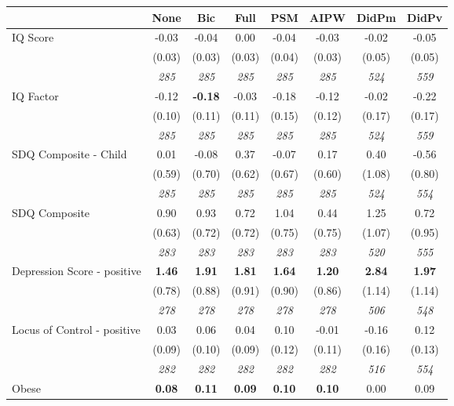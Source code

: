 \begin{tabular}{l c c c c c c c}
\toprule
 & None & Bic & Full & PSM & AIPW & DidPm & DidPv \\
\midrule
IQ Score & -0.03 & -0.04 & 0.00 & -0.04 & -0.03 & -0.02 & -0.05 \\
& (0.03) & (0.03) & (0.03) & (0.04) & (0.03) & (0.05) & (0.05) \\
& \textit{ 285 } & \textit{ 285 } & \textit{ 285 } & \textit{ 285 } & \textit{ 285 } & \textit{ 524 } & \textit{ 559 } \\
IQ Factor & -0.12 & \textbf{ -0.18 } & -0.03 & -0.18 & -0.12 & -0.02 & -0.22 \\
& (0.10) & (0.11) & (0.11) & (0.15) & (0.12) & (0.17) & (0.17) \\
& \textit{ 285 } & \textit{ 285 } & \textit{ 285 } & \textit{ 285 } & \textit{ 285 } & \textit{ 524 } & \textit{ 559 } \\
SDQ Composite - Child & 0.01 & -0.08 & 0.37 & -0.07 & 0.17 & 0.40 & -0.56 \\
& (0.59) & (0.70) & (0.62) & (0.67) & (0.60) & (1.08) & (0.80) \\
& \textit{ 285 } & \textit{ 285 } & \textit{ 285 } & \textit{ 285 } & \textit{ 285 } & \textit{ 524 } & \textit{ 554 } \\
SDQ Composite & 0.90 & 0.93 & 0.72 & 1.04 & 0.44 & 1.25 & 0.72 \\
& (0.63) & (0.72) & (0.72) & (0.75) & (0.75) & (1.07) & (0.95) \\
& \textit{ 283 } & \textit{ 283 } & \textit{ 283 } & \textit{ 283 } & \textit{ 283 } & \textit{ 520 } & \textit{ 555 } \\
Depression Score - positive & \textbf{ 1.46 } & \textbf{ 1.91 } & \textbf{ 1.81 } & \textbf{1.64} & \textbf{1.20} & \textbf{ 2.84 } & \textbf{ 1.97 } \\
& (0.78) & (0.88) & (0.91) & (0.90) & (0.86) & (1.14) & (1.14) \\
& \textit{ 278 } & \textit{ 278 } & \textit{ 278 } & \textit{ 278 } & \textit{ 278 } & \textit{ 506 } & \textit{ 548 } \\
Locus of Control - positive & 0.03 & 0.06 & 0.04 & 0.10 & -0.01 & -0.16 & 0.12 \\
& (0.09) & (0.10) & (0.09) & (0.12) & (0.11) & (0.16) & (0.13) \\
& \textit{ 282 } & \textit{ 282 } & \textit{ 282 } & \textit{ 282 } & \textit{ 282 } & \textit{ 516 } & \textit{ 554 } \\
Obese & \textbf{ 0.08 } & \textbf{ 0.11 } & \textbf{ 0.09 } & \textbf{0.10} & \textbf{0.10} & 0.00 & 0.09 \\

\end{tabular}
